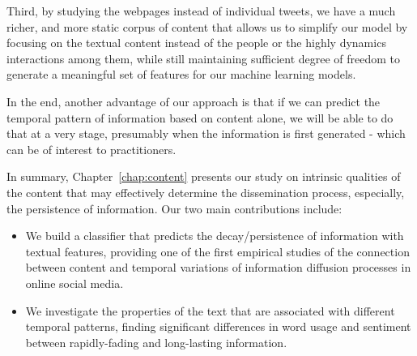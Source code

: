 \documentclass[phd,tocprelim]{cornell}
\begin{document}
Third, by studying the webpages instead of individual tweets, we have a much richer, and more static corpus of content that allows us to simplify our model by focusing on the textual content instead of the people or the highly dynamics interactions among them, while still maintaining sufficient degree of freedom to generate a meaningful set of features for our machine learning models.

In the end, another advantage of our approach is that if we can predict the temporal pattern of information based on content alone, we will be able to do that at a very stage, presumably when the information is first generated - which can be of interest to practitioners. 

In summary, Chapter~\ref{chap:content} presents our study on intrinsic qualities of the content that may effectively determine the dissemination process, especially, the persistence of information. Our two main contributions include:
\begin{itemize}
\item We build a classifier that predicts the decay/persistence of information with textual features, providing one of the first empirical studies of the connection between content and temporal variations of information diffusion processes in online social media.
\item We investigate the properties of the text that are associated with different temporal patterns, finding significant differences in word usage and sentiment between rapidly-fading and long-lasting information.
\end{itemize}






\end{document}
